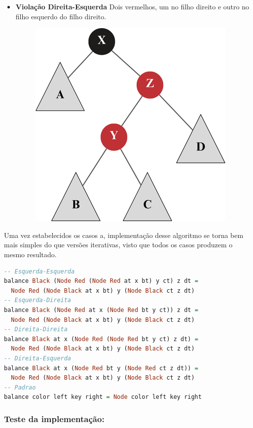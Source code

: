 \begin{itemize}
\begin{figure}[!ht]
		      \caption{}
	      \end{figure}
	      \FloatBarrier
	\item \textbf{Violação Direita-Esquerda} Dois vermelhos, um no filho direito e outro no filho esquerdo do filho direito.
	      \begin{figure}[!ht]
		      \centering
		      \includegraphics[scale=0.5]{figures/rubro-negra/right-left.png}
		      \caption{}
	      \end{figure}
	      \FloatBarrier
\end{itemize}

\noindent
Uma vez estabelecidos os casos a, implementação desse algoritmo se torna bem mais simples do que versões iterativas, visto que todos os casos produzem o mesmo resultado.

\begin{lstlisting}[language=haskell]
-- Esquerda-Esquerda
balance Black (Node Red (Node Red at x bt) y ct) z dt =
  Node Red (Node Black at x bt) y (Node Black ct z dt)
-- Esquerda-Direita
balance Black (Node Red at x (Node Red bt y ct)) z dt =
  Node Red (Node Black at x bt) y (Node Black ct z dt)
-- Direita-Direita
balance Black at x (Node Red (Node Red bt y ct) z dt) =
  Node Red (Node Black at x bt) y (Node Black ct z dt)
-- Direita-Esquerda
balance Black at x (Node Red bt y (Node Red ct z dt)) =
  Node Red (Node Black at x bt) y (Node Black ct z dt)
-- Padrao
balance color left key right = Node color left key right
\end{lstlisting}
\FloatBarrier


\subsubsection{Teste da implementação:}


